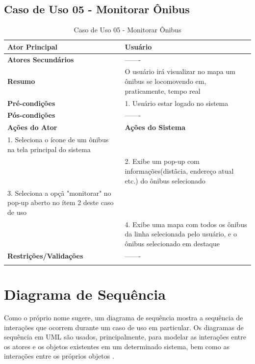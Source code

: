 \subsection{Caso de Uso 05 - Monitorar \^{O}nibus}
\begin{center}
\begin{longtable}{p{8cm}|p{8cm}}
    \hline
    \textbf{Ator Principal} & Usu\'{a}rio \\
    \hline
    \textbf{Atores Secund\'{a}rios} & ------- \\
    \hline
    \textbf{Resumo} & O usu\'{a}rio ir\'{a} visualizar no mapa um \^{o}nibus se locomovendo em, praticamente, tempo real \\
    \hline
    \textbf{Pr\'{e}-condi\c{c}\~{o}es} & 1. Usu\'{a}rio estar logado no sistema \\
    \hline
    \textbf{P\'{o}s-condi\c{c}\~{o}es} & ------- \\
    \hline
    \textbf{A\c{c}\~{o}es do Ator} & \textbf{A\c{c}\~{o}es do Sistema} \\
    1. Seleciona o \'{i}cone de um \^{o}nibus na tela principal do sistema & \\
    \hline
    & 2. Exibe um pop-up com informa\c{c}\~{o}es(dist\^{a}cia, endere\c{c}o atual etc.) do \^{o}nibus selecionado \\
    \hline
    3. Seleciona a op\c{c}\~{a} "monitorar" no pop-up aberto no \'{i}tem 2 deste caso de uso& \\
    \hline
    & 4. Exibe uma mapa com todos os \^{o}nibus da linha selecionada pelo usu\'{a}rio, e o \^{o}nibus selecionado em destaque \\
    \hline
    \hline
    \textbf{Restri\c{c}\~{o}es/Valida\c{c}\~{o}es} & ------- \\
\hline
\caption{Caso de Uso 05 - Monitorar \^{O}nibus}
\end{longtable}
\end{center}


\section{Diagrama de Sequência}
\label{sc:diagramaDeSequencia}

Como o pr\'{o}prio nome sugere, um diagrama de sequ\^{e}ncia mostra a sequ\^{e}ncia de intera\c{c}\~{o}es que ocorrem durante um caso de uso em particular. Os diagramas de sequ\^{e}ncia em UML s\~{a}o usados, principalmente, para modelar as intera\c{c}\~{o}es entre os atores e os objetos existentes em um determinado sistema, bem como as intera\c{c}\~{o}es entre os pr\'{o}prios objetos \cite{sommerville11}.\newline

